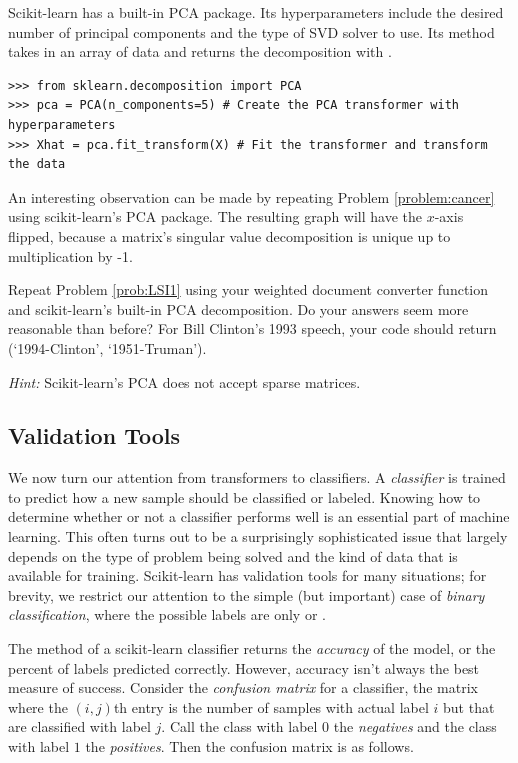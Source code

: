 Scikit-learn has a built-in PCA package.
Its hyperparameters include the desired number of principal components and the type of SVD solver to use.
Its  method takes in an array of data and returns the decomposition with .

\begin{lstlisting}
>>> from sklearn.decomposition import PCA 
>>> pca = PCA(n_components=5) # Create the PCA transformer with hyperparameters
>>> Xhat = pca.fit_transform(X) # Fit the transformer and transform the data
\end{lstlisting}

\begin{info}
An interesting observation can be made by repeating Problem \ref{problem:cancer} using scikit-learn's PCA package.
The resulting graph will have the $x$-axis flipped, because a matrix's singular value decomposition is unique up to multiplication by -1.
\end{info}

\begin{problem} %
Repeat Problem \ref{prob:LSI1} using your weighted document converter function and scikit-learn's built-in PCA decomposition.
Do your answers seem more reasonable than before?
For Bill Clinton's 1993 speech, your code should return (`1994-Clinton', `1951-Truman').

\emph{Hint:} Scikit-learn's PCA does not accept sparse matrices.
\end{problem}

\subsection*{Validation Tools} %

We now turn our attention from transformers to classifiers.
A \emph{classifier} is trained to predict how a new sample should be classified or labeled.
Knowing how to determine whether or not a classifier performs well is an essential part of machine learning.
This often turns out to be a surprisingly sophisticated issue that largely depends on the type of problem being solved and the kind of data that is available for training.
Scikit-learn has validation tools for many situations; for brevity, we restrict our attention to the simple (but important) case of \emph{binary classification}, where the possible labels are only  or .

The  method of a scikit-learn classifier returns the \emph{accuracy} of the model, or the percent of labels predicted correctly.
However, accuracy isn't always the best measure of success.
Consider the \emph{confusion matrix} for a classifier, the matrix where the $(i,j)$th entry is the number of samples with actual label $i$ but that are classified with label $j$.
Call the class with label $0$ the \emph{negatives} and the class with label $1$ the \emph{positives}.
Then the confusion matrix is as follows. 


